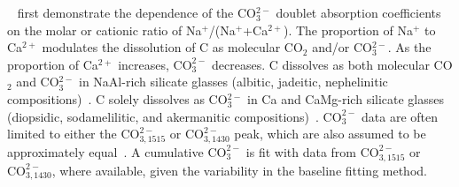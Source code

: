 \documentclass[draft]{agujournal2019}
\begin{document}
~ first demonstrate the dependence of the CO$_{3}^{2-}$ doublet absorption coefficients on the molar or cationic ratio of Na$^{+}$/(Na$^{+}$+Ca$^{2+}$). The proportion of Na$^{+}$ to Ca$^{2+}$ modulates the dissolution of C as molecular CO$_{2}$ and/or CO$_{3}^{2-}$. As the proportion of Ca$^{2+}$ increases, \textepsilon${\mathrm{CO_3^{2-}}}$ decreases. C dissolves as both molecular CO$_{2}$ and CO$_{3}^{2-}$ in NaAl-rich silicate glasses (albitic, jadeitic, nephelinitic compositions)~\cite{DixonandPan1995, FineandStolper1985, MysenandVirgo1980a, MysenandVirgo1980b}. C solely dissolves as CO$_{3}^{2-}$ in Ca and CaMg-rich silicate glasses (diopsidic, sodamelilitic, and akermanitic compositions)~\cite{DixonandPan1995, FineandStolper1986}. \textepsilon${\mathrm{CO_3^{2-}}}$ data are often limited to either the \textepsilon${\mathrm{CO_{3, 1515}^{2-}}}$ or \textepsilon${\mathrm{CO_{3, 1430}^{2-}}}$ peak, which are also assumed to be approximately equal~\cite{DixonandPan1995}. A cumulative \textepsilon${\mathrm{CO_3^{2-}}}$ is fit with data from \textepsilon${\mathrm{CO_{3, 1515}^{2-}}}$ or \textepsilon${\mathrm{CO_{3, 1430}^{2-}}}$, where available, given the variability in the baseline fitting method. 
\end{document}
